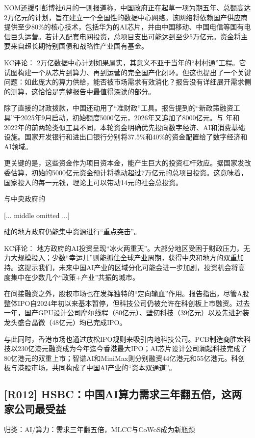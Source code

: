 \documentclass[11pt]{ctexart}
\begin{document}
NOM还援引彭博社6月的一则报道称，中国政府正在起草一项为期五年、总额高达2万亿元的计划，旨在建立一个全国性的数据中心网络。该网络将依赖国产供应商提供至少80\%的核心技术，包括华为的AI芯片，并由中国移动、中国电信等国有电信巨头运营。若计入配套电网投资，总项目支出可能达到至少5万亿元。资金将主要来自超长期特别国债和战略性产业国有基金。

KC评论： 2万亿数据中心计划如果属实，其意义不亚于当年的“村村通”工程。它试图构建一个从芯片到算力、再到运营的完全国产化闭环。但这也提出了一个关键问题：如此庞大的算力供给，能否被市场需求有效消化？报告没有详细展开需求侧的测算，这恰恰是完整报告中最值得深读的部分。

除了直接的财政拨款，中国还动用了“准财政”工具。报告提到的“新政策融资工具”于2025年9月启动，初始额度5000亿元，2026年又追加了8000亿元。与 年和2022年的前两轮类似工具不同，本轮资金明确优先投向数字经济、AI和消费基础设施。国家开发银行和进出口银行分别将37.5\%和40\%的资金配置给了数字经济和AI领域。

更关键的是，这些资金作为项目资本金，能产生巨大的投资杠杆效应。据国家发改委估算，初始的5000亿元资金预计将撬动超过7万亿元的总项目投资。这意味着，国家投入的每一元钱，理论上可以带动14元的社会总投资。

与中央政府的

[... middle omitted ...]

础的地方政府仍能集中资源进行“重点突击”。

KC评论： 地方政府的AI投资呈现“冰火两重天”。大部分地区受困于财政压力，无力大规模投入；少数“幸运儿”则能抓住全球产业周期，获得中央和地方的双重加持。这提示我们，未来中国AI产业的区域分化可能会进一步加剧，投资机会将高度集中在少数几个“政策+产业”共振的城市。

在间接融资之外，股权市场也在发挥独特的“定向输血”作用。报告指出，尽管A股整体IPO自2024年初以来基本暂停，但科技公司仍被允许在科创板上市融资。过去一年，国产GPU设计公司摩尔线程（80亿元）、壁仞科技（39亿元）以及先进封装龙头盛合晶微（48亿元）均已完成IPO。

与此同时，香港市场也通过放松IPO规则来吸引内地科技公司。PCB制造商胜宏科技以230亿港元融资成为今年迄今香港最大IPO；AI芯片设计公司澜起科技完成了80亿港元的双重上市；智谱AI和MiniMax则分别融资44亿港元和55亿港元。科创板与港股市场，共同构成了中国AI产业的“资本双通道”。

\subsection{[R012] HSBC：中国AI算力需求三年翻五倍，这两家公司最受益}
{\small\color{refgray}归类：AI/算力：需求三年翻五倍，MLCC与CoWoS成为新瓶颈}
\end{document}
